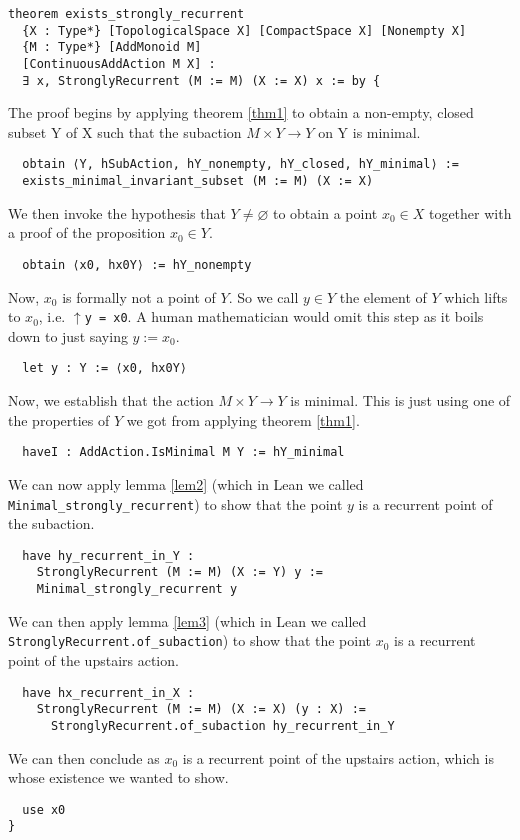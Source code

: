 \documentclass[11pt]{article}
\theoremstyle{definition}              %
\theoremstyle{definition}              %
\theoremstyle{definition}              %
\begin{document}
\begin{lstlisting}
theorem exists_strongly_recurrent
  {X : Type*} [TopologicalSpace X] [CompactSpace X] [Nonempty X]
  {M : Type*} [AddMonoid M]
  [ContinuousAddAction M X] :
  ∃ x, StronglyRecurrent (M := M) (X := X) x := by {
\end{lstlisting}
The proof begins by applying theorem \ref{thm1} to obtain a non-empty, closed subset Y of X such that the subaction $M \times Y \to Y$ on Y is minimal.
\begin{lstlisting}
  obtain ⟨Y, hSubAction, hY_nonempty, hY_closed, hY_minimal⟩ :=
  exists_minimal_invariant_subset (M := M) (X := X)
\end{lstlisting}
We then invoke the hypothesis that $Y \neq \varnothing$ to obtain a point $x_0 \in X$ together with a proof of the proposition $x_0 \in Y$. 
\begin{lstlisting}
  obtain ⟨x0, hx0Y⟩ := hY_nonempty
\end{lstlisting}
Now, $x_0$ is formally not a point of $Y$. So we call $y \in Y$ the element of $Y$ which lifts to $x_0$, i.e. $\uparrow$\verb|y = x0|. A human mathematician would omit this step as it boils down to just saying $y:=x_0$.
\begin{lstlisting}
  let y : Y := ⟨x0, hx0Y⟩
\end{lstlisting}
Now, we establish that the action $M \times Y \to Y$ is minimal. This is just using one of the properties of $Y$ we got from applying theorem \ref{thm1}.
\begin{lstlisting}
  haveI : AddAction.IsMinimal M Y := hY_minimal
\end{lstlisting}
We can now apply lemma \ref{lem2} (which in Lean we called \verb|Minimal_strongly_recurrent|) to show that the point $y$ is a recurrent point of the subaction.
\begin{lstlisting}
  have hy_recurrent_in_Y :
    StronglyRecurrent (M := M) (X := Y) y :=
    Minimal_strongly_recurrent y
\end{lstlisting}
We can then apply lemma \ref{lem3} (which in Lean we called \verb|StronglyRecurrent.of_subaction|) to show that the point $x_0$ is a recurrent point of the upstairs action.
\begin{lstlisting}
  have hx_recurrent_in_X :
    StronglyRecurrent (M := M) (X := X) (y : X) :=
      StronglyRecurrent.of_subaction hy_recurrent_in_Y
\end{lstlisting}
We can then conclude as $x_0$ is a recurrent point of the upstairs action, which is whose existence we wanted to show.
\begin{lstlisting}
  use x0
}
\end{lstlisting}
\end{document}
